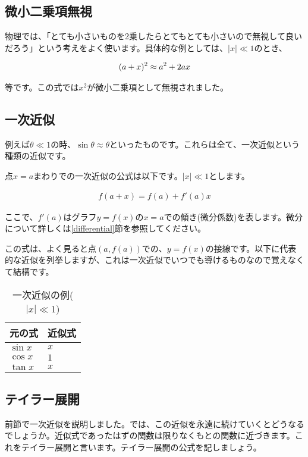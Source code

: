 \subsection{微小二乗項無視}
物理では、「とても小さいものを2乗したらとてもとても小さいので無視して良いだろう」という考えをよく使います。具体的な例としては、$|x|\ll1$のとき、

\begin{eqnarray}
    (a+x)^2 \approx a^2 + 2ax \notag
\end{eqnarray}

等です。この式では$x^2$が微小二乗項として無視されました。




\subsection{一次近似}
例えば$\theta\ll1$の時、$\sin\theta \approx\theta$といったものです。これらは全て、一次近似という種類の近似です。

点$x=a$まわりでの一次近似の公式は以下です。$|x|\ll1$とします。

\begin{eqnarray}
    f(a+x) = f(a)+f'(a)x
\end{eqnarray}

ここで、$f'(a)$はグラフ$y=f(x)$の$x=a$での傾き(微分係数)を表します。微分について詳しくは\ref{differential}節を参照してください。

この式は、よく見ると点$(a,f(a))$での、$y=f(x)$の接線です。以下に代表的な近似を列挙しますが、これは一次近似でいつでも導けるものなので覚えなくて結構です。

\begin{table}[htb]
 \begin{center}
  \caption{一次近似の例($|x|\ll1$)}
  \label{tab:approx}
  \begin{tabular}{l|l}
    \hline
    元の式 & 近似式 \\
    \hline \hline
    $\sin x$ & $x$ \\
    $\cos x$ & $1$ \\
    $\tan x$ & $x$
  \end{tabular}
 \end{center}
\end{table}


\subsection{テイラー展開}
\label{taylor}
前節で一次近似を説明しました。では、この近似を永遠に続けていくとどうなるでしょうか。近似式であったはずの関数は限りなくもとの関数に近づきます。これをテイラー展開と言います。テイラー展開の公式を記しましょう。

